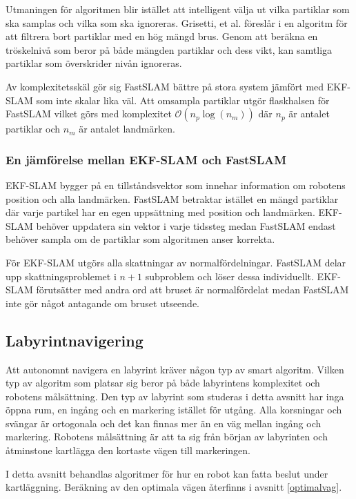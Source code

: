 \documentclass[11pt]{article}
\begin{document}
\begin{flushleft}
Utmaningen för algoritmen blir istället att intelligent välja ut vilka partiklar som ska samplas och vilka som ska ignoreras. Grisetti, et al. föreslår i \cite{reo} en algoritm för att filtrera bort partiklar med en hög mängd brus. Genom att beräkna en tröskelnivå som beror på både mängden partiklar och dess vikt, kan samtliga partiklar som överskrider nivån ignoreras. 

Av komplexitetsskäl gör sig FastSLAM bättre på stora system jämfört med EKF-SLAM som inte skalar lika väl. Att omsampla partiklar utgör flaskhalsen för FastSLAM vilket görs med komplexitet $\mathcal{O}\left(n_{p}\log\left(n_{m}\right)\right)$ där $n_p$ är antalet partiklar och $n_m$ är antalet landmärken.

\subsubsection{En jämförelse mellan EKF-SLAM och FastSLAM}
EKF-SLAM bygger på en tillståndsvektor som innehar information om robotens position och alla landmärken. FastSLAM betraktar istället en mängd partiklar där varje partikel har en egen uppsättning med position och landmärken. EKF-SLAM behöver uppdatera sin vektor i varje tidssteg medan FastSLAM endast behöver sampla om de partiklar som algoritmen anser korrekta. 

För EKF-SLAM utgörs alla skattningar av normalfördelningar. FastSLAM delar upp skattningsproblemet i $n + 1$ subproblem och löser dessa individuellt. EKF-SLAM förutsätter med andra ord att bruset är normalfördelat medan FastSLAM inte gör något antagande om bruset utseende.

\subsection{Labyrintnavigering}
\label{mapping}
Att autonomnt navigera en labyrint kräver någon typ av smart algoritm. Vilken typ av algoritm som platsar sig beror på både labyrintens komplexitet och robotens målsättning. Den typ av labyrint som studeras i detta avsnitt har inga öppna rum, en ingång och en markering istället för utgång. Alla korsningar och svängar är ortogonala och det kan finnas mer än en väg mellan ingång och markering. Robotens målsättning är att ta sig från början av labyrinten och åtminstone kartlägga den kortaste vägen till markeringen.

I detta avsnitt behandlas algoritmer för hur en robot kan fatta beslut under kartläggning. Beräkning av den optimala vägen återfinns i  avsnitt \ref{optimalvag}.


\end{flushleft}
\end{document}
